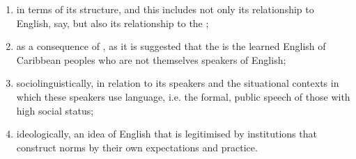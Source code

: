 \begin{enumerate}
\item in terms of its structure, and this includes not only its relationship to English, say, but also its relationship to the  ;

\item as a consequence of , as it is suggested that the  is the learned English of Caribbean peoples who are not themselves  speakers of English;

\item sociolinguistically, in relation to its speakers and the situational contexts in which these speakers use language, i.e. the formal, public speech of those with high social status;

\item ideologically, an idea of English that is legitimised by institutions that construct norms by their own expectations and practice. 
 \end{enumerate}

